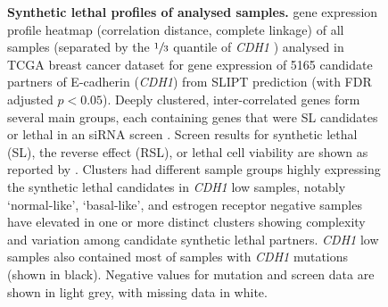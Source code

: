\begin{figure}[!htbp]
  \centering
    \caption[Synthetic lethal  profiles of analysed samples]{\small \textbf{Synthetic lethal  profiles of analysed samples.} \Gls{gene expression} profile heatmap (correlation distance, complete linkage) of all samples (separated by the $\sfrac{1}{3}$ quantile of \textit{CDH1} ) analysed in \gls{TCGA} breast cancer dataset for \gls{gene expression} of 5165 candidate partners of \gls{E-cadherin} (\textit{CDH1}) from \gls{SLIPT} prediction (with \gls{FDR} adjusted $p < 0.05$). Deeply clustered, inter-correlated genes form several main groups, each containing genes that were SL candidates or lethal in an \gls{siRNA} screen \citep{Telford2015}. Screen results for \gls{synthetic lethal} (SL), the reverse effect (RSL), or lethal cell viability are shown as reported by \citet{Telford2015}. Clusters had different sample groups highly expressing the \gls{synthetic lethal} candidates in \textit{CDH1} low samples, notably `normal-like', `basal-like', and estrogen receptor negative samples have elevated  in one or more distinct clusters showing complexity and variation among candidate \gls{synthetic lethal} partners. \textit{CDH1} low samples also contained most of samples with \textit{CDH1} \glspl{mutation} (shown in black). Negative values for \gls{mutation} and screen data are shown in light grey, with missing data in white.
}
\label{fig:slipt_expr}
\end{figure}

